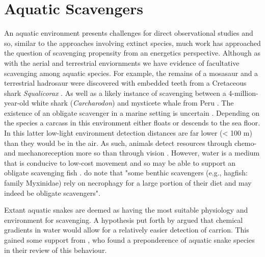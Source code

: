 \documentclass[a4paper,12pt]{article}
\begin{document}
\section*{Aquatic Scavengers} 
An aquatic environment presents challenges for direct observational studies and so, similar to the approaches involving extinct species, much work has approached the question of scavenging propensity from an energetics perspective. Although as with the aerial and terrestrial enviornments we have evidence of facultative scavenging among aquatic species. For example, the remains of a mosasaur and a terrestrial hadrosaur were discovered with embedded teeth from a Cretaceous shark \textit{Squalicorax} \citep{schwimmer1997scavenging}. As well as a likely instance of scavenging between a 4-million-year-old white shark (\textit{Carcharodon}) and mysticete whale from Peru \citep{ehret2009caught}.
The existence of an obligate scavenger in a marine setting is uncertain \citep{britton1994marine,smith2003ecology,ruxton2004energetic,ruxton2005searching}. Depending on the species a carcass in this environment either floats or descends to the sea floor. In this latter low-light environment detection distances are far lower (< 100 m) than they would be in the air. As such, animals detect resources through chemo- and mechanoreception more so than through vision \citep{ruxton2004energetic}. However, water is a medium that is conducive to low-cost movement \citep{tucker1975energetic} and so may be able to support an obligate scavenging fish \citep{ruxton2004energetic,ruxton2005searching}. \cite{benbow2015introduction} do note that "some benthic scavengers (e.g., hagfish: family Myxinidae) rely on necrophagy for a large portion of their diet and may indeed be obligate scavengers". 

Extant aquatic snakes are deemed as having the most suitable physiology and environment for scavenging. A hypothesis put forth by \cite{sazima1990necrofagia} argued that chemical gradients in water would allow for a relatively easier detection of carrion. This gained some support from \cite{devault2002scavenging}, who found a preponderence of aquatic snake species in their review of this behaviour. 
\end{document}
